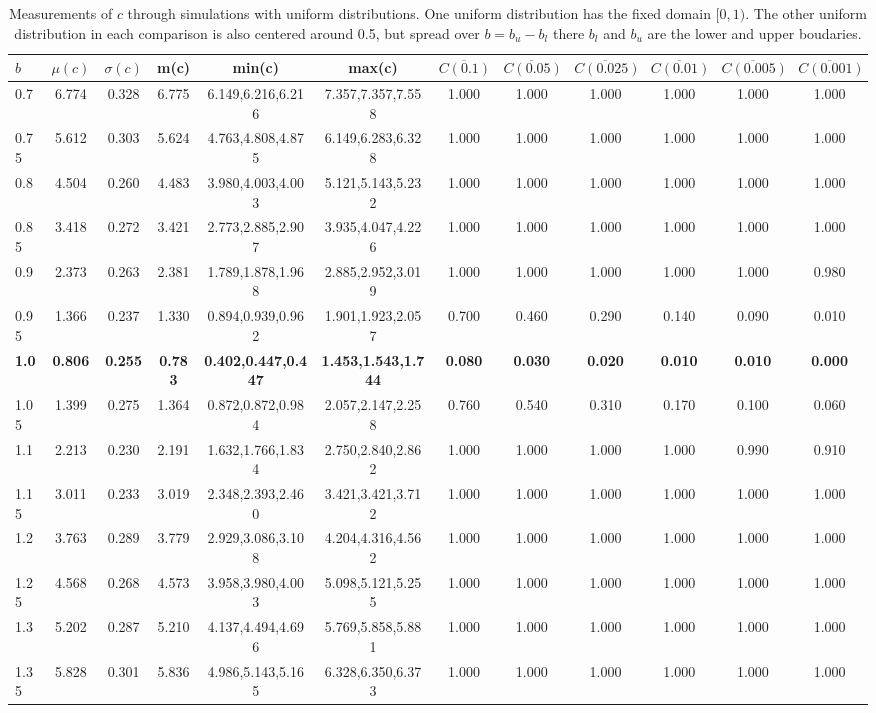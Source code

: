 \begin{table*}[h!]
\begin{center}
\begin{tabular}{| l | c | c | c | c | c | c | c | c | c | c | c |}\hline
$b$ & $\mu(c)$ & $\sigma(c)$ & m(c) & min(c) & max(c) & $\overline{C(0.1)}$ & $\overline{C(0.05)}$ & $\overline{C(0.025)}$ & $\overline{C(0.01)}$ & $\overline{C(0.005)}$ & $\overline{C(0.001)}$ \\\hline\hline
0.7 & 6.774 & 0.328 & 6.775 & 6.149,6.216,6.216 & 7.357,7.357,7.558  & 1.000  & 1.000  & 1.000  & 1.000  & 1.000  & 1.000 \\\hline
0.75 & 5.612 & 0.303 & 5.624 & 4.763,4.808,4.875 & 6.149,6.283,6.328  & 1.000  & 1.000  & 1.000  & 1.000  & 1.000  & 1.000 \\\hline
0.8 & 4.504 & 0.260 & 4.483 & 3.980,4.003,4.003 & 5.121,5.143,5.232  & 1.000  & 1.000  & 1.000  & 1.000  & 1.000  & 1.000 \\\hline
0.85 & 3.418 & 0.272 & 3.421 & 2.773,2.885,2.907 & 3.935,4.047,4.226  & 1.000  & 1.000  & 1.000  & 1.000  & 1.000  & 1.000 \\\hline
0.9 & 2.373 & 0.263 & 2.381 & 1.789,1.878,1.968 & 2.885,2.952,3.019  & 1.000  & 1.000  & 1.000  & 1.000  & 1.000  & 0.980 \\\hline
0.95 & 1.366 & 0.237 & 1.330 & 0.894,0.939,0.962 & 1.901,1.923,2.057  & 0.700  & 0.460  & 0.290  & 0.140  & 0.090  & 0.010 \\\hline
{\bf 1.0} & {\bf 0.806} & {\bf 0.255} & {\bf 0.783} & {\bf 0.402,0.447,0.447} & {\bf 1.453,1.543,1.744} & {\bf 0.080} & {\bf 0.030} & {\bf 0.020} & {\bf 0.010} & {\bf 0.010} & {\bf 0.000} \\\hline
1.05 & 1.399 & 0.275 & 1.364 & 0.872,0.872,0.984 & 2.057,2.147,2.258  & 0.760  & 0.540  & 0.310  & 0.170  & 0.100  & 0.060 \\\hline
1.1 & 2.213 & 0.230 & 2.191 & 1.632,1.766,1.834 & 2.750,2.840,2.862  & 1.000  & 1.000  & 1.000  & 1.000  & 0.990  & 0.910 \\\hline
1.15 & 3.011 & 0.233 & 3.019 & 2.348,2.393,2.460 & 3.421,3.421,3.712  & 1.000  & 1.000  & 1.000  & 1.000  & 1.000  & 1.000 \\\hline
1.2 & 3.763 & 0.289 & 3.779 & 2.929,3.086,3.108 & 4.204,4.316,4.562  & 1.000  & 1.000  & 1.000  & 1.000  & 1.000  & 1.000 \\\hline
1.25 & 4.568 & 0.268 & 4.573 & 3.958,3.980,4.003 & 5.098,5.121,5.255  & 1.000  & 1.000  & 1.000  & 1.000  & 1.000  & 1.000 \\\hline
1.3 & 5.202 & 0.287 & 5.210 & 4.137,4.494,4.696 & 5.769,5.858,5.881  & 1.000  & 1.000  & 1.000  & 1.000  & 1.000  & 1.000 \\\hline
1.35 & 5.828 & 0.301 & 5.836 & 4.986,5.143,5.165 & 6.328,6.350,6.373  & 1.000  & 1.000  & 1.000  & 1.000  & 1.000  & 1.000 \\\hline
\end{tabular}
\caption{Measurements of $c$ through simulations
with uniform distributions.
One uniform distribution has the fixed domain $[0,1)$.
The other uniform distribution in each comparison
is also centered around 0.5,
but spread over $b=b_u-b_l$ there $b_l$ and $b_u$ are the lower and upper boudaries.}
\end{center}
\end{table*}